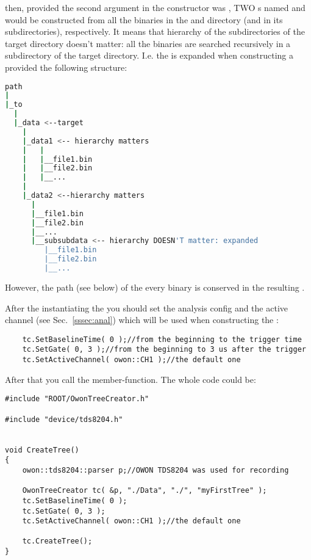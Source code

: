 then, provided the second argument in the  constructor
was , TWO s named  and
 would be constructed from all the binaries in the  and
 directory (and in its subdirectories), respectively.
It means that hierarchy of the subdirectories of the target directory doesn't matter:
all the binaries are searched recursively in a subdirectory of the target directory. I.e.
the  is expanded when constructing a  provided the following
structure:
\begin{lstlisting}[language=bash]
path
|
|_to
  |
  |_data <--target
    |
    |_data1 <-- hierarchy matters
    |   | 
    |   |__file1.bin
    |   |__file2.bin
    |   |__...
    |
    |_data2 <--hierarchy matters
      |
      |__file1.bin
      |__file2.bin
      |__...
      |__subsubdata <-- hierarchy DOESN'T matter: expanded
         |__file1.bin
         |__file2.bin
         |__...
\end{lstlisting}
However, the path (see below) of the every binary is conserved in the resulting
.

After the instantiating the  you should set the analysis config and
the active channel
(see Sec.~\ref{sssec:anal}) which will be used when constructing the :
\begin{lstlisting}
    tc.SetBaselineTime( 0 );//from the beginning to the trigger time
    tc.SetGate( 0, 3 );//from the beginning to 3 us after the trigger
    tc.SetActiveChannel( owon::CH1 );//the default one
\end{lstlisting}


After that you call the  member-function. The whole code could be:

\begin{lstlisting}
#include "ROOT/OwonTreeCreator.h"

#include "device/tds8204.h"


void CreateTree()
{
    owon::tds8204::parser p;//OWON TDS8204 was used for recording

    OwonTreeCreator tc( &p, "./Data", "./", "myFirstTree" );
    tc.SetBaselineTime( 0 );
    tc.SetGate( 0, 3 );
    tc.SetActiveChannel( owon::CH1 );//the default one

    tc.CreateTree();
}
\end{lstlisting}

